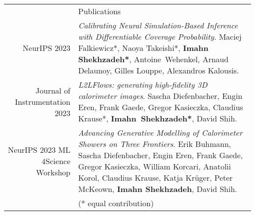 \documentclass[11pt, a4paper]{article}
\newcommand{\headingfont}{\Large\color{OliveGreen}}
\newenvironment{SectionTable}[1]{
	\renewcommand*{\arraystretch}{1.7}
	\setlength{\tabcolsep}{10pt}
	\begin{longtable}{Rp{5.2in}} & #1 \\}
	{\end{longtable}\vspace{-.3cm}}
\begin{document}
	\begin{SectionTable}{\headingfont Publications} 
        NeurIPS 2023 & \textit{Calibrating Neural Simulation-Based Inference with Differentiable Coverage Probability}. 
        Maciej Falkiewicz*, Naoya Takeishi*, \textbf{Imahn Shekhzadeh*}, \mbox{Antoine Wehenkel}, Arnaud Delaunoy, Gilles Louppe, 
        Alexandros Kalousis. \\

        Journal of \mbox{Instrumentation} 2023 & \textit{L2LFlows: generating high-fidelity 3D calorimeter images}.
        Sascha Diefenbacher, Engin Eren, Frank Gaede, Gregor Kasieczka, Claudius Krause*, \mbox{\textbf{Imahn Shekhzadeh*}}, David Shih. \\

        NeurIPS 2023 ML$4$Science Workshop & \textit{Advancing Generative Modelling of Calorimeter Showers on Three Frontiers}.
        Erik Buhmann, Sascha Diefenbacher, Engin Eren, Frank Gaede, Gregor Kasieczka, William Korcari, Anatolii Korol, 
        Claudius Krause, Katja Krüger, Peter McKeown, \textbf{Imahn Shekhzadeh}, David Shih. \\[18pt]

        & \small (* equal contribution) \normalsize
        
	\end{SectionTable}
	
	\newpage 
\end{document}
